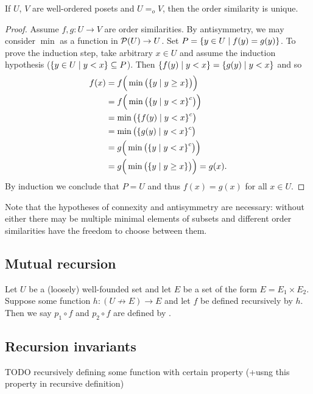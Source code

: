 \begin{corollary} \label{WOSetsUniqueSimilarity}
If $U$, $V$ are well-ordered posets and $U =_o V$, then the order similarity is unique.
\end{corollary}
\begin{proof}
Assume $f,g: U\to V$ are order similarities. By antisymmetry, we may consider $\min$ as a function in $\operatorname{\mathcal{P}}(U)\to U$. Set $P = \setbuilder{y\in U}{f(y) = g(y)}$. To prove the induction step, take arbitrary $x\in U$ and assume the induction hypothesis ($\setbuilder{y\in U}{y<x} \subseteq P$). Then $\setbuilder{f(y)}{y< x} = \setbuilder{g(y)}{y< x}$ and so
\begin{align*}
f(x) &= f\Big(\min\big(\setbuilder{y}{y\geq x}\big)\Big) \\
&= f\Big(\min\big(\setbuilder{y}{y < x}^c\big)\Big) \\
&= \min\big(\setbuilder{f(y)}{y< x}^c\big) \\
&= \min\big(\setbuilder{g(y)}{y< x}^c\big) \\
&= g\Big(\min\big(\setbuilder{y}{y < x}^c\big)\Big) \\
&= g\Big(\min\big(\setbuilder{y}{y\geq x}\big)\Big) = g(x).
\end{align*}
By induction we conclude that $P=U$ and thus $f(x) = g(x)$ for all $x\in U$.
\end{proof}

Note that the hypotheses of connexity and antisymmetry are necessary: without either there may be multiple minimal elements of subsets and different order similarities have the freedom to choose between them.

\subsection{Mutual recursion}
\begin{definition}
Let $U$ be a (loosely) well-founded set and let $E$ be a set of the form $E = E_1\times E_2$. Suppose some function $h:(U\not\to E)\to E$ and let $f$ be defined recursively by $h$. Then we say $p_1\circ f$ and $p_2 \circ f$ are defined by .
\end{definition}


\subsection{Recursion invariants}




TODO recursively defining some function with certain property (+usng this property in recursive definition)


